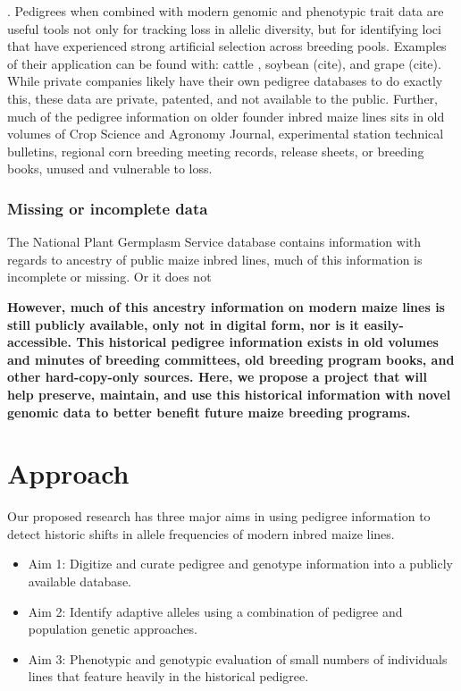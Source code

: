 \documentclass[12pt]{article}
\begin{document}
. Pedigrees when combined with modern genomic and phenotypic trait data are useful tools not only for tracking loss in allelic diversity, but for identifying loci that have experienced strong artificial selection across breeding pools. Examples of their application can be found with: cattle \citep{Decker:2012kd}, soybean (cite), and grape (cite). 
While private companies likely have their own pedigree databases to do exactly this, these data are private, patented, and not available to the public. 
Further, much of the pedigree information on older founder inbred maize lines sits in old volumes of Crop Science and Agronomy Journal, experimental station technical bulletins, regional corn breeding meeting records, release sheets, or breeding books, unused and vulnerable to loss. %
%
%
\subsubsection*{Missing or incomplete data}

The National Plant Germplasm Service database contains information with regards to ancestry of public maize inbred lines, much of this information is incomplete or missing. Or it does not 

\textbf{However, much of this ancestry information on modern maize lines  is still publicly available, only not in digital form, nor is it easily-accessible. This historical pedigree information exists in old volumes and minutes of breeding committees, old breeding program books, and other hard-copy-only sources. Here, we propose a project that will help preserve, maintain, and use this historical information with novel genomic data to better benefit future maize breeding programs.} 

\section*{Approach}
\label{sec:approach}
Our proposed research has three major aims in using pedigree information to detect historic shifts in allele frequencies of modern inbred maize lines.

\begin{itemize}
\item Aim 1: Digitize and curate pedigree and genotype information into a publicly available database. 
\item Aim 2: Identify adaptive alleles using a combination of pedigree and population genetic approaches.
\item Aim 3: Phenotypic and genotypic evaluation of small numbers of individuals lines that feature heavily in the historical pedigree.

\end{itemize}
\end{document}
